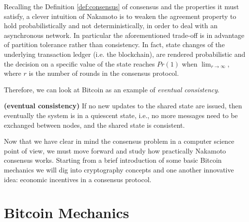 \bigskip
\noindent
Recalling the Definition \ref{def:consensus} of consensus and the properties it must satisfy, a clever intuition of Nakamoto is to weaken the agreement property to hold probabilistically and not deterministically, in order to deal with an asynchronous network. In particular the aforementioned trade-off is in advantage of partition tolerance rather than consistency. In fact, state changes of the underlying transaction ledger (i.e. the blockchain), are rendered probabilistic and the decision on a specific value of the state reaches $Pr(1)$ when $\lim_{r \to \infty}$, where $r$ is the number of rounds in the consensus protocol.

\bigskip
\noindent
Therefore, we can look at Bitcoin as an example of \textit{eventual consistency}.
\begin{mydef}{\bf (eventual consistency)}
    If no new updates to the shared state are issued, then eventually the system is in a quiescent state, i.e., no more messages need to be exchanged between nodes, and the shared state is consistent.
\end{mydef}

\bigskip
\noindent
Now that we have clear in mind the consensus problem in a computer science point of view, we must move forward and study how practically Nakamoto consensus works. Starting from a brief introduction of some basic Bitcoin mechanics we will dig into cryptography concepts and one another innovative idea: economic incentives in a consensus protocol.

\bigskip
\section{Bitcoin Mechanics}
